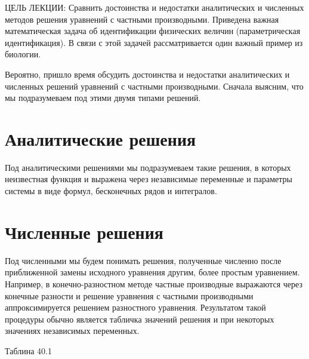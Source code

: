 \documentclass[
]{article}
\begin{document}
ЦЕЛЬ ЛЕКЦИИ: Сравнить достоинства и недостатки аналитических и численных
методов решения уравнений с частными производными. Приведена важная
математическая задача об идентификации физических величин
(параметрическая идентификация). В связи с этой задачей рассматривается
один важный пример из биологии.

Вероятно, пришло время обсудить достоинства и недостатки аналитических и
численных решений уравнений с частными производными. Сначала выясним,
что мы подразумеваем под этими двумя типами решений.

\section{Аналитические
решения}\label{ux430ux43dux430ux43bux438ux442ux438ux447ux435ux441ux43aux438ux435-ux440ux435ux448ux435ux43dux438ux44f}

Под аналитическими решениями мы подразумеваем такие решения, в которых
неизвестная функция и выражена через независимые переменные и параметры
системы в виде формул, бесконечных рядов и интегралов.

\section{Численные
решения}\label{ux447ux438ux441ux43bux435ux43dux43dux44bux435-ux440ux435ux448ux435ux43dux438ux44f}

Под численными мы будем понимать решения, полученные численно после
приближенной замены исходного уравнения другим, более простым
уравнением. Например, в конечно-разностном методе частные производные
выражаются через конечные разности и решение уравнения с частными
производными аппроксимируется решением разностного уравнения.
Результатом такой процедуры обычно является табличка значений решения и
при некоторых значениях независимых переменных.

Таблина 40.1
\end{document}
